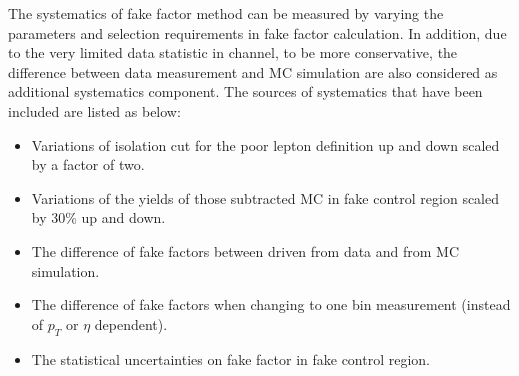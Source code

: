 The systematics of fake factor method can be measured by varying the parameters and selection requirements in fake factor calculation.
In addition, due to the very limited data statistic in \llll channel, to be more conservative, 
the difference between data measurement and MC simulation are also considered as additional systematics component.
The sources of systematics that have been included are listed as below:
\begin{itemize}
	\item Variations of isolation cut for the poor lepton definition up and down scaled by a factor of two.
	\item Variations of the yields of those subtracted MC in fake control region scaled by 30\% up and down.
	\item The difference of fake factors between driven from data and from MC simulation.
	\item The difference of fake factors when changing to one bin measurement (instead of $p_{T}$ or $\eta$ dependent).
	\item The statistical uncertainties on fake factor in fake control region.
\end{itemize}

